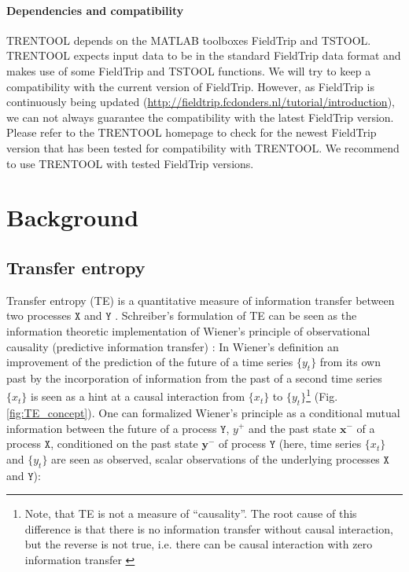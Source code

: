 \documentclass[a4paper,10pt]{article}
\begin{document}
\paragraph*{Dependencies and compatibility} TRENTOOL depends on the MATLAB toolboxes FieldTrip and TSTOOL. TRENTOOL expects input data to be in the standard FieldTrip data format and makes use of some FieldTrip and TSTOOL functions. We will try to keep a compatibility with the current version of FieldTrip. However, as FieldTrip is continuously being updated (\url{http://fieldtrip.fcdonders.nl/tutorial/introduction}), we can not always guarantee the compatibility with the latest FieldTrip version. Please refer to the TRENTOOL homepage to check for the newest FieldTrip version that has been tested for compatibility with TRENTOOL. We recommend to use TRENTOOL with tested FieldTrip versions. 



\newpage
\section{Background} \label{sec:background}

\subsection{Transfer entropy}

Transfer entropy (TE) is a quantitative measure of information transfer between two processes $\texttt{X}$ and $\texttt{Y}$ \cite{schreiber2000}. Schreiber's formulation of TE can be seen as the information theoretic implementation of Wiener's principle of observational causality (predictive information transfer) \cite{wiener1956,vicente2011}: In Wiener's definition an improvement of the prediction of the future of a time series $\{y_t\}$ from its own past by the incorporation of information from the past of a second time series $\{x_t\}$ is seen as a hint at a causal interaction from $\{x_t\}$ to $\{y_t\}$\footnote{Note, that TE is not a measure of ``causality''. The root cause of this difference is that there is no information transfer without causal interaction, but the reverse is not true, i.e. there can be causal interaction with zero information transfer \cite{ay2008,lizier2010b,chicharro2009}} (Fig. \ref{fig:TE_concept}). One can formalized Wiener's principle as a conditional mutual information 
between the future of a process $\texttt{Y}$, $y^+$ and the past state $\mathbf{x}^-$ of a process $\texttt{X}$, conditioned on the past state $\mathbf{y}^-$ of process $\texttt{Y}$ \cite{schreiber2000,vicente2011} (here, time series $\{x_t\}$ and $\{y_t\}$ are seen as observed, scalar observations of the underlying processes $\texttt{X}$ and $\texttt{Y}$):
\end{document}

